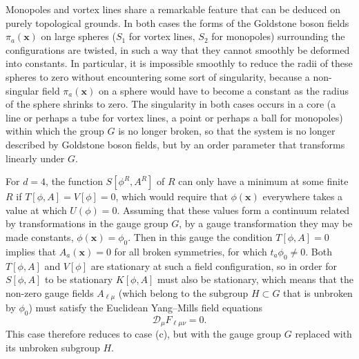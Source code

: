 Monopoles and vortex lines share a remarkable feature that can be deduced
on purely topological grounds. In both cases the forms of the Goldstone
boson fields $\pi_a(\mathbf{x})$ on large spheres ($S_1$ for vortex lines,
$S_2$ for monopoles) surrounding the configurations are twisted, in such a
way that they cannot smoothly be deformed into constants. In particular,
it is impossible smoothly to reduce the radii of these spheres to zero
without encountering some sort of singularity, because a non-singular field
$\pi_a(\mathbf{x})$ on a sphere would have to become a constant as the
radius of the sphere shrinks to zero. The singularity in both cases occurs
in a core (a line or perhaps a tube for vortex lines, a point or perhaps a
ball for monopoles) within which the group $G$ is no longer broken, so that
the system is no longer described by Goldstone boson fields, but by an
order parameter that transforms linearly under $G$.

For $d=4$, the function $S[\phi^R,A^R]$ of $R$ can only have a minimum at
some finite $R$ if $T[\phi,A]=V[\phi]=0$, which would require that
$\phi(\mathbf{x})$ everywhere takes a value at which $U(\phi)=0$. Assuming
that these values form a continuum related by transformations in the gauge
group $G$, by a gauge transformation they may be made constants,
$\phi(\mathbf{x})=\phi_0$. Then in this gauge the condition $T[\phi,A]=0$
implies that $A_a(\mathbf{x})=0$ for all broken symmetries, for which
$t_a\phi_0\ne0$. Both $T[\phi,A]$ and $V[\phi]$ are stationary at such
a field configuration, so in order for $S[\phi,A]$ to be stationary
$K[\phi,A]$ must also be stationary, which means that the non-zero gauge
fields $A_{\ell\mu}$ (which belong to the subgroup $H\subset G$ that is
unbroken by $\phi_0$) must satisfy the Euclidean Yang--Mills field equations
\begin{equation}
 \mathcal D_\mu F_{\ell\mu\nu}=0.
 \tag{23.1.10}\label{eq:23.1.10}
\end{equation}
This case therefore reduces to case (c), but with the gauge group $G$
replaced with its unbroken subgroup $H$.
